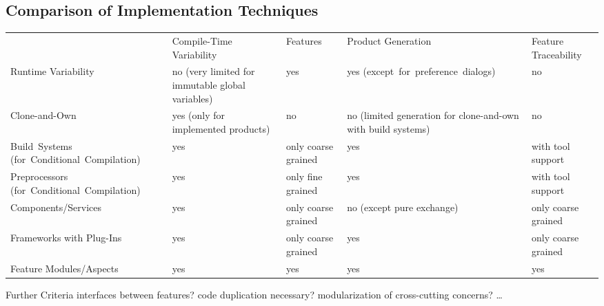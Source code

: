 \subsection{Comparison of Implementation Techniques}
\begin{frame}[fragile]{\myframetitle}
	\centering
	\renewcommand{\arraystretch}{1.2}
	\newcommand{\myexception}[1]{\tiny{}(#1)}
	\begin{tabular}{p{32mm}p{32mm}p{14mm}p{27mm}p{14mm}}
		 & Compile-Time Variability & Features & Product Generation & Feature \mbox{Traceability} \pause\\\rowcolor{gray}
		Runtime Variability & no \myexception{very limited for immutable global variables} & yes & yes \mbox{\myexception{except for preference dialogs}} & no \pause\\
		Clone-and-Own & yes \linebreak\myexception{only for implemented products} & no & no \myexception{limited generation for clone-and-own with build systems} & no \pause\\\rowcolor{gray}
		\mbox{Build Systems} \mbox{\myexception{for Conditional Compilation}} & yes & only coarse grained & yes & with tool support \pause\\
		Preprocessors \mbox{\myexception{for Conditional Compilation}} & yes & only fine grained & yes & with tool support \pause\\\rowcolor{gray}
		Components/Services & yes & only coarse grained & no \linebreak\myexception{except pure exchange} & only coarse grained \pause\\
		Frameworks with Plug-Ins & yes & only coarse grained & yes & only coarse grained \pause\\\rowcolor{gray}
		Feature Modules/Aspects & yes & yes & yes & yes \pause\\
	\end{tabular}
	\begin{note}{Further Criteria}
		interfaces between features? code duplication necessary? modularization of cross-cutting concerns? \ldots
	\end{note}
\end{frame}


